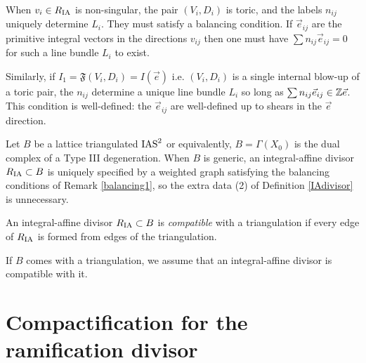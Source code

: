 \documentclass[table,x11names]{amsart}
\begin{document}
\begin{remark}\label{balancing1}
  When $v_i\in R_{\rm IA}$ is non-singular, the pair $(V_i,D_i)$ is toric,
  and the labels $n_{ij}$ uniquely determine $L_i$. They must satisfy
  a balancing condition. If $\vec{e}_{ij}$ are the primitive integral
  vectors in the directions $v_{ij}$ then one must have
  $\sum n_{ij}\vec{e}_{ij}=0$ for such a line bundle $L_i$ to exist.

  Similarly, if $I_1=\mathfrak{F}(V_i,D_i)=I(\vec{e})$
  i.e. $(V_i,D_i)$ is a single internal blow-up of a
  toric pair, the $n_{ij}$ determine a unique line bundle $L_i$ so
  long as $\sum n_{ij}\vec{e}_{ij} \in \mathbb{Z}\vec{e}$. This condition is
  well-defined: the $\vec{e}_{ij}$ are well-defined up to shears in the
  $\vec{e}$ direction.
\end{remark}


Let $B$ be a lattice triangulated $\operatorname{IAS}^2$ or equivalently,
$B=\Gamma(X_0)$ is the dual complex of a Type III 
degeneration. When $B$ is generic, an integral-affine divisor
$R_{\rm IA}\subset B$ is uniquely specified by a weighted graph satisfying
the balancing conditions of Remark \ref{balancing1}, so the extra
data (2) of Definition \ref{IAdivisor} is unnecessary.

\begin{definition}
  An integral-affine divisor $R_{\rm IA}\subset B$ is {\it compatible} with
  a triangulation if every edge of $R_{\rm IA}$ is formed from edges of the
  triangulation.
\end{definition}

If $B$ comes with a triangulation, we assume that an integral-affine
divisor is compatible with it. 


\section{Compactification for the ramification divisor}
\label{sec:ramification-divisor}
\end{document}
